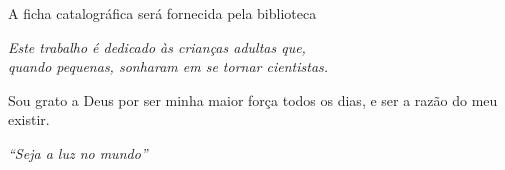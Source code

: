 \documentclass[
	oldfontcommands,
	sumario=abnt-6027-2012,
	12pt,			%
	openright,		%
	oneside,		%
	a4paper,		%
	english,		%
	brazil			%
	]{imecc-unicamp}
\begin{document}
\begin{fichacatalografica}
    \begin{center}
	{\ABNTEXchapterfont\large A ficha catalográfica será fornecida pela biblioteca}
    \end{center}
%     
\end{fichacatalografica}
\begin{dedicatoria}
   \vspace*{\fill}
   \centering
   \noindent
   \textit{
      Este trabalho é dedicado às crianças adultas que,\\
      quando pequenas, sonharam em se tornar cientistas.
   }
   \vspace*{\fill}
\end{dedicatoria}
\begin{agradecimentos}
Sou grato a Deus por ser minha maior força todos os dias, e ser a razão do meu existir. 

\end{agradecimentos}
\begin{epigrafe}
    \vspace*{\fill}
    \begin{flushright}
	\textit{``Seja a luz no mundo''
	}
    \end{flushright}
\end{epigrafe}
\end{document}
